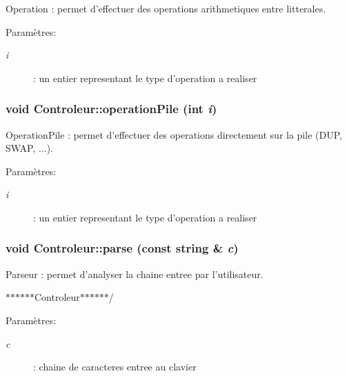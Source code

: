 Operation : permet d'effectuer des operations arithmetiques entre litterales. 

\begin{Desc}
\item[Paramètres:]
\begin{description}
\item[{\em i}]: un entier representant le type d'operation a realiser \end{description}
\end{Desc}
\hypertarget{class_controleur_59c48ea6ab32a447c665ca1b7c220f8f}{
\subsubsection[{operationPile}]{\setlength{\rightskip}{0pt plus 5cm}void Controleur::operationPile (int {\em i})}}
\label{class_controleur_59c48ea6ab32a447c665ca1b7c220f8f}


OperationPile : permet d'effectuer des operations directement sur la pile (DUP, SWAP, ...). 

\begin{Desc}
\item[Paramètres:]
\begin{description}
\item[{\em i}]: un entier representant le type d'operation a realiser \end{description}
\end{Desc}
\hypertarget{class_controleur_3b3ae1907bbec700443d18ebed7c4131}{
\subsubsection[{parse}]{\setlength{\rightskip}{0pt plus 5cm}void Controleur::parse (const string \& {\em c})}}
\label{class_controleur_3b3ae1907bbec700443d18ebed7c4131}


Parseur : permet d'analyser la chaine entree par l'utilisateur. 

$\ast$$\ast$$\ast$$\ast$$\ast$$\ast$Controleur$\ast$$\ast$$\ast$$\ast$$\ast$$\ast$/

\begin{Desc}
\item[Paramètres:]
\begin{description}
\item[{\em c}]: chaine de caracteres entree au clavier \end{description}
\end{Desc}


